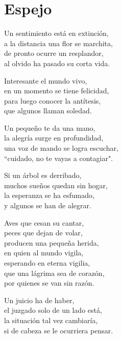 \section*{Espejo}
\label{Espejo}

\vspace{1em}
\begin{center}
Un sentimiento está en extinción,\\ 
a la distancia una flor se marchita,\\ 
de pronto ocurre un resplandor,\\ 
al olvido ha pasado su corta vida.

\vspace{1em} 
Interesante el mundo vivo,\\ 
en un momento se tiene felicidad,\\ 
para luego conocer la antítesis,\\ 
que algunos llaman soledad.

\vspace{1em} 
Un pequeño te da una mano,\\ 
la alegría surge en profundidad,\\ 
una voz de mando se logra escuchar,\\ 
``cuidado, no te vayas a contagiar".

\vspace{1em} 
Si un árbol es derribado,\\ 
muchos sueños quedan sin hogar,\\ 
la esperanza se ha esfumado,\\ 
y algunos se han de alegrar.

\vspace{1em} 
Aves que cesan su cantar,\\ 
peces que dejan de volar,\\ 
producen una pequeña herida,\\ 
en quien al mundo vigila,\\ 
esperando en eterna vigilia,\\ 
que una lágrima sea de corazón,\\ 
por quienes se van sin razón.

\vspace{1em} 
Un juicio ha de haber,\\ 
el juzgado solo de un lado está,\\ 
la situación tal vez cambiaría,\\ 
si de cabeza se le ocurriera pensar.


\end{center}
